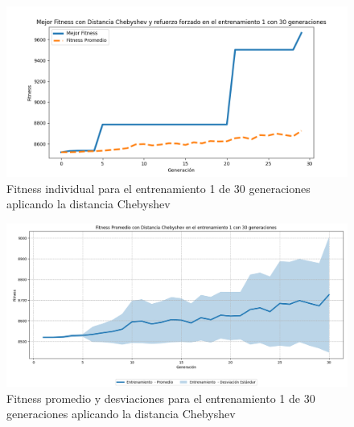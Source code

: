 \documentclass[conference]{IEEEtran}
\begin{document}
\begin{figure}[H]
    \centering
    \includegraphics[width=0.9 \linewidth]{Chebyshev/Fitness_individual_30Gen/Fitness_1_Cheby_30Gen.png}
    \caption{Fitness individual para el entrenamiento 1 de 30 generaciones aplicando la distancia Chebyshev}
    \label{fig:cheb_1_30}
\end{figure}
\begin{figure}[H]
    \centering
    \includegraphics[width=0.9 \linewidth]{Chebyshev/Fitness_individual_30Gen/Fitness_1_Cheby_30Gen_Sombra.png}
    \caption{Fitness promedio y desviaciones para el entrenamiento 1 de 30 generaciones aplicando la distancia Chebyshev}
    \label{fig:cheb_1_30_sombra}
\end{figure}
\end{document}
